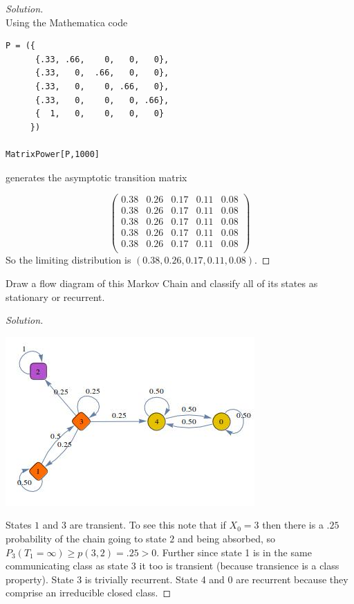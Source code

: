 \documentclass[12pt]{article}
\newenvironment{problem}[2][Problem]{\begin{trivlist}
\item[\hskip \labelsep {\bfseries #1}\hskip \labelsep {\bfseries #2.}]}{\end{trivlist}}
\newenvironment{solution}
  {\begin{proof}[Solution]\renewcommand{\qedsymbol}{}}
  {\end{proof}}
\begin{document}
\begin{solution}\ \\

Using the Mathematica code \\

\begin{lstlisting}[frame=single]  
P = ({
      {.33, .66,    0,   0,   0},
      {.33,   0,  .66,   0,   0},
   	  {.33,   0,    0, .66,   0},
      {.33,   0,    0,   0, .66},
      {  1,   0,    0,   0,   0}
     })
  
MatrixPower[P,1000]
\end{lstlisting}generates the asymptotic transition matrix 

$$\begin{pmatrix} 
 0.38 & 0.26 & 0.17 & 0.11 & 0.08 \\
 0.38 & 0.26 & 0.17 & 0.11 & 0.08 \\
 0.38 & 0.26 & 0.17 & 0.11 & 0.08 \\
 0.38 & 0.26 & 0.17 & 0.11 & 0.08 \\
 0.38 & 0.26 & 0.17 & 0.11 & 0.08 \\
\end{pmatrix}
$$
So the limiting distribution is $ (0.38, 0.26, 0.17, 0.11, 0.08) $.
\end{solution}

\begin{problem}{3(a)} %
Draw a flow diagram of this Markov Chain and classify all of its states as stationary or
recurrent.
\end{problem}
\begin{solution}\ \\

\begin{center}
	\includegraphics[scale=.7]{transition_diagram.jpg}
\end{center}

States $1$ and $3$ are transient. To see this note that if $X_0 = 3$ then there is a $.25$ probability of the chain going to state $2$ and being absorbed, so $P_3(T_1 = \infty) \geq p(3,2) = .25 > 0$. Further since state 1 is in the same communicating class as state 3 it too is transient (because transience is a class property). State 3 is trivially recurrent. State 4 and 0 are recurrent because they comprise an irreducible closed class.
\end{solution}
\end{document}
